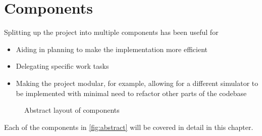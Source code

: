 \documentclass[../dissertation.tex]{subfiles}
\begin{document}
\section{Components}

Splitting up the project into multiple components has been useful for
\begin{itemize}
  \item Aiding in planning to make the implementation more efficient
  \item Delegating specific work tasks
  \item Making the project modular, for example, allowing for a different simulator
    to be implemented with minimal need to refactor other parts of the codebase
\end{itemize}

\begin{figure}[H]
\centering
  \label{fig:abstract}
  \caption{Abstract layout of components}
\end{figure}

Each of the components in \autoref{fig:abstract} will be covered in detail in this
chapter.


\end{document}
